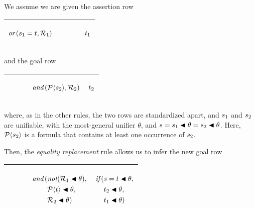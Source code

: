 \documentclass[runningheads]{llncs}
\DeclareMathOperator{\uand}{\emph{and}\,}
\DeclareMathOperator{\uor}{\emph{or}\,}
\DeclareMathOperator{\unot}{\emph{not}\kern-.0pt}
\DeclareMathOperator{\uif}{\emph{if}\,}
\begin{document}
We assume we are given the assertion row
   \begin{center}
\begin{tabular} {T}
\hline
\begin{center}
    $\uor(\expsub{s}{1}= t,\expsub{\mathcal{R}}{1})$ 
  \end{center}  
    & $\qquad$ &\begin{center} ${t}_{1}$\end{center}  
    \\
  \hline
\end{tabular}
\end{center}
\noindent and the goal row
  \begin{center}
\begin{tabular} {T}
\hline
   $\qquad$ &  
   \begin{center}
 $\uand (\mathcal{P}\langle\expsub{s}{2}\rangle,\expsub{\mathcal{R}}{2})$
\end{center}
     &\begin{center} ${t}_{2}$\end{center} \\
  \hline
\end{tabular}
\end{center}

\noindent where, as in the other rules, the two rows are standardized apart, and ${s}_{1}$ and ${s}_{2}$ are unifiable, with the most-general unifier $\theta$, and $s = {s}_{1} \blacktriangleleft \theta = {s}_{2} \blacktriangleleft \theta$.  Here, $\mathcal{P}\langle{s}_{2}\rangle$ is a formula that contains at least one occurrence of ${s}_{2}.$

Then, the \emph{equality replacement} rule allows us to infer the new goal row
  \begin{center}
\begin{tabular} {T}
\hline
   $\qquad$ & 
   \begin{center}
     $\begin{aligned}
\uand(&\!\unot({\expsub{\mathcal{R}}{1} \apply \theta}),\\
&\mathcal{P}\langle t\rangle\apply \theta, \\  
&\expsub{\mathcal{R}}{2} \apply \theta)
\end{aligned}$
\end{center} & 
\begin{center}
$
\begin{aligned}
\uif(&{s = t\apply \theta}, \\
&{\expsub{t}{2} \apply \theta}, \\
&{\expsub{t}{1} \apply \theta})
\end{aligned}
$
\end{center}\\
  \hline
\end{tabular}
\end{center}
\end{document}
